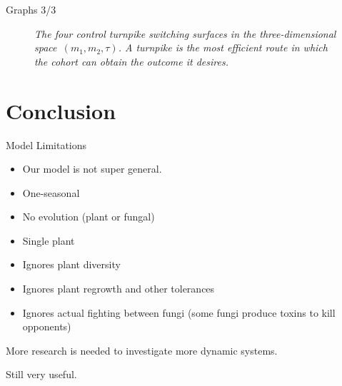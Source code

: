 \documentclass{beamer}
\begin{document}
\begin{frame}{Graphs 3/3}
    \begin{figure}
        \bf \caption{\it The four control turnpike switching surfaces in the three-dimensional space~$ (m_1, m_2, \tau) $. A turnpike is the most efficient route in which the cohort can obtain the outcome it desires.}
        \label{Fig_7}
    \end{figure}
\end{frame}

\section{Conclusion}
\begin{frame}{Model Limitations}
    \begin{itemize}
        \item Our model is not super general.
        \item One-seasonal
        \item No evolution (plant or fungal)
        \item Single plant
        \item Ignores plant diversity 
        \item Ignores plant regrowth and other tolerances
        \item Ignores actual fighting between fungi (some fungi produce toxins to kill opponents)
    \end{itemize}
    
    More research is needed to investigate more dynamic systems.\newline
    
    Still very useful.
\end{frame}
\end{document}
